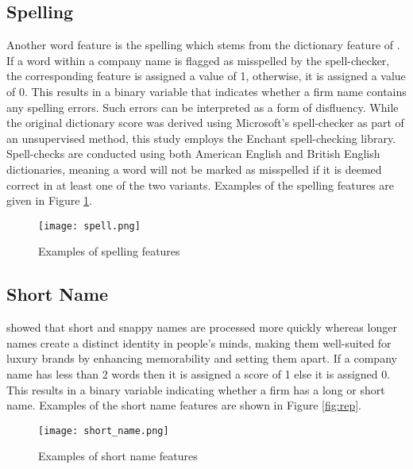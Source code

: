 \documentclass[a4paper,11pt]{report}
\begin{document}
\subsection{Spelling}
Another word feature is the spelling which stems from the dictionary feature of . If a word within a company name is flagged as misspelled by the spell-checker, the corresponding feature is assigned a value of 1, otherwise, it is assigned a value of 0. This results in a binary variable that indicates whether a firm name contains any spelling errors. Such errors can be interpreted as a form of disfluency. While the original dictionary score was derived using Microsoft’s spell-checker as part of an unsupervised method, this study employs the Enchant spell-checking library. Spell-checks are conducted using both American English and British English dictionaries, meaning a word will not be marked as misspelled if it is deemed correct in at least one of the two variants. Examples of the spelling features are given in Figure \ref{fig:spell}.

\begin{figure}[h!]
    \centering
    \texttt{[image: spell.png]}
    \caption{Examples of spelling features}
    \label{fig:spell}
\end{figure}

\subsection{Short Name}
 showed that short and snappy names are processed more quickly whereas longer names create a distinct identity in people's minds, making them well-suited for luxury brands by enhancing memorability and setting them apart. If a company name has less than 2 words then it is assigned a score of 1 else it is assigned 0. This results in a binary variable indicating whether a firm has a long or short name. Examples of the short name features are shown in Figure \ref{fig:rep}.

\begin{figure}[h!]
    \centering
    \texttt{[image: short\_name.png]}
    \caption{Examples of short name features}
    \label{fig:short_name}
\end{figure}
\end{document}
